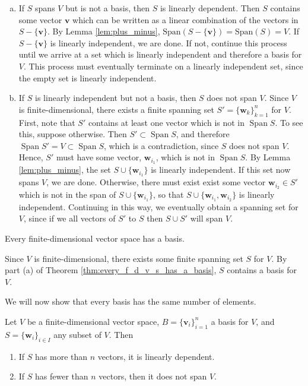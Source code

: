 \documentclass[12pt,letterpaper,reqno]{article}
\numberwithin{equation}{section}
\newcommand{\bv}{\mathbf{v}}
\newcommand{\bw}{\mathbf{w}}
\DeclareMathOperator{\Span}{Span}
\begin{document}
\begin{pf}
	\begin{enumerate}[(a)]
		\item If $S$ spans $V$ but is not a basis, then $S$ is linearly dependent. Then $S$ contains some vector $\bv$ which can be written as a linear combination of the vectors in $S-\{\bv\}$. By Lemma \ref{lem:plus_minus}, $\text{Span}(S-\{\bv\})=\text{Span}(S)=V$. If $S-\{\bv\}$ is linearly independent, we are done. If not, continue this process until we arrive at a set which is linearly independent and therefore a basis for $V$. This process must eventually terminate on a linearly independent set, since the empty set is linearly independent.
		\item If $S$ is linearly independent but not a basis, then $S$ does not span $V$. Since $V$ is finite-dimensional, there exists a finite spanning set $S'=\{\mathbf{w}_k\}_{k=1}^n$ for $V$. First, note that $S'$ contains at least one vector which is not in $\Span S$. To see this, suppose otherwise. Then $S' \subset \Span S$, and therefore $\Span S'=V \subset \Span S$, which is a contradiction, since $S$ does not span $V$. Hence, $S'$ must have some vector, $\mathbf{w}_{i_1}$, which is not in $\Span S$. By Lemma \ref{lem:plus_minus}, the set $S \cup \{\mathbf{w}_{i_1}\}$ is linearly independent. If this set now spans $V$, we are done. Otherwise, there must exist exist some vector $\mathbf{w}_{i_2} \in S'$ which is not in the span of $S \cup \{\mathbf{w}_{i_1}\}$, so that $S \cup \{\mathbf{w}_{i_1},\mathbf{w}_{i_2}\}$ is linearly independent. Continuing in this way, we eventually obtain a spanning set for $V$, since if we all vectors of $S'$ to $S$ then $S \cup S'$ will span $V$.
			\end{enumerate}
\end{pf}

\begin{cor}
	Every finite-dimensional vector space has a basis.
\end{cor}

\begin{pf}
	Since $V$ is finite-dimensional, there exists some finite spanning set $S$ for $V$. By part (a) of Theorem \ref{thm:every_f_d_v_s_has_a_basis}, $S$ contains a basis for $V$.
\end{pf}

We will now show that every basis has the same number of elements.

\begin{thm}\label{thm:bigger_smaller_dim}
	Let $V$ be a finite-dimensional vector space, $B=\{\bv_i\}_{i=1}^n$ a basis for $V$, and $S=\{\bw_i\}_{i \in I}$ any subset of $V$. Then
	\begin{enumerate}
		\item If $S$ has more than $n$ vectors, it is linearly dependent.
		\item If $S$ has fewer than $n$ vectors, then it does not span $V$.
	\end{enumerate}
\end{thm}
\end{document}
